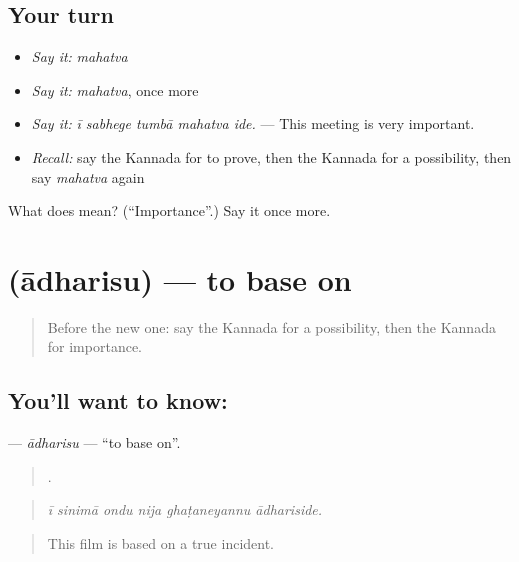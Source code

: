 \subsection*{Your turn}
\begin{itemize}
\raggedright
  \item \emph{Say it:} \emph{mahatva}
  \item \emph{Say it:} \emph{mahatva}, once more
  \item \emph{Say it:} \emph{ī sabhege tumbā mahatva ide.} — This meeting is very important.
  \item \emph{Recall:} say the Kannada for to prove, then the Kannada for a possibility, then say \emph{mahatva} again
\end{itemize}

\begin{tcolorbox}[breakable,colback=teal!4,colframe=teal!35!black,title={Before you move on}]
What does  mean? (\textquotedblleft{}Importance\textquotedblright{}.) Say it once more.
\end{tcolorbox}
\section[\texorpdfstring{\kn{ಆಧರಿಸು} (ādharisu)}{ಆಧರಿಸು (ādharisu)}]{ (ādharisu) — to base on}

\label{lesson:KA-C376-adharisu}



\begin{quote}
Before the new one: say the Kannada for a possibility, then the Kannada for importance.
\end{quote}

\subsection*{You'll want to know: }
\textbf{} — \emph{ādharisu} — \textquotedblleft{}to base on\textquotedblright{}.

\begin{quote}
     .
\end{quote}

\begin{quote}
\emph{ī sinimā ondu nija ghaṭaneyannu ādhariside.}
\end{quote}

\begin{quote}
This film is based on a true incident.
\end{quote}


